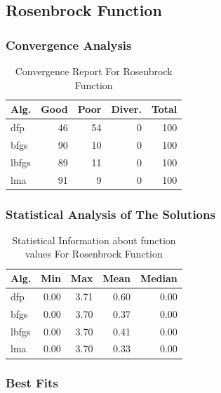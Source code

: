 \documentclass[conference]{IEEEtran}
\begin{document}
\subsection{Rosenbrock Function}
\label{rosenbrock4d4D}

\subsubsection{Convergence Analysis}
\label{convergencerosenbrock4d4D}

\begin{table}[H]
\centering
\caption{Convergence Report For Rosenbrock Function}
\label{convergence:rosenbrock4d}
\begin{tabular}{lrrrr}
\toprule
 Alg. &  Good &  Poor &  Diver. &  Total \\
\midrule
  dfp &    46 &    54 &       0 &    100 \\
 bfgs &    90 &    10 &       0 &    100 \\
lbfgs &    89 &    11 &       0 &    100 \\
  lma &    91 &     9 &       0 &    100 \\
\bottomrule
\end{tabular}
\end{table}

\subsubsection{Statistical Analysis of The Solutions}
\label{statisticalanalysisrosenbrock4d4D}

\begin{table}[H]
\centering
\caption{Statistical Information about function values For Rosenbrock Function}
\label{function_values:rosenbrock4d}
\begin{tabular}{lrrrr}
\toprule
 Alg. &  Min &  Max &  Mean &  Median \\
\midrule
  dfp & 0.00 & 3.71 &  0.60 &    0.00 \\
 bfgs & 0.00 & 3.70 &  0.37 &    0.00 \\
lbfgs & 0.00 & 3.70 &  0.41 &    0.00 \\
  lma & 0.00 & 3.70 &  0.33 &    0.00 \\
\bottomrule
\end{tabular}
\end{table}

\subsubsection{Best Fits}
\label{bestfitsrosenbrock4d4D}
\end{document}
